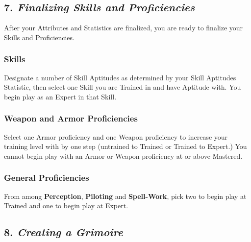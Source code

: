 \documentclass[
]{article}
\begin{document}
\hypertarget{finalizing-skills-and-proficiencies}{%
\subsection{\texorpdfstring{7. \emph{Finalizing Skills and
Proficiencies}}{7. Finalizing Skills and Proficiencies}}\label{finalizing-skills-and-proficiencies}}

After your Attributes and Statistics are finalized, you are ready to
finalize your Skills and Proficiencies.

\hypertarget{skills}{%
\subsubsection{\texorpdfstring{\textbf{Skills}}{Skills}}\label{skills}}

Designate a number of Skill Aptitudes as determined by your Skill
Aptitudes Statistic, then select one Skill you are Trained in and have
Aptitude with. You begin play as an Expert in that Skill.

\hypertarget{weapon-and-armor-proficiencies}{%
\subsubsection{\texorpdfstring{\textbf{Weapon and Armor
Proficiencies}}{Weapon and Armor Proficiencies}}\label{weapon-and-armor-proficiencies}}

Select one Armor proficiency and one Weapon proficiency to increase your
training level with by one step (untrained to Trained or Trained to
Expert.) You cannot begin play with an Armor or Weapon proficiency at or
above Mastered.

\hypertarget{general-proficiencies}{%
\subsubsection{\texorpdfstring{\textbf{General
Proficiencies}}{General Proficiencies}}\label{general-proficiencies}}

From among \textbf{Perception}, \textbf{Piloting} and
\textbf{Spell-Work}, pick two to begin play at Trained and one to begin
play at Expert.

\hypertarget{creating-a-grimoire}{%
\subsection{\texorpdfstring{8. \emph{Creating a
Grimoire}}{8. Creating a Grimoire}}\label{creating-a-grimoire}}
\end{document}
